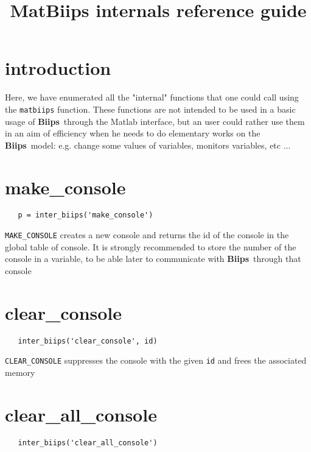 \documentclass[11pt,twoside]{article}
\newcommand{\biips}{{\bf Biips}{}}
\begin{document}
\title{MatBiips internals reference guide}
\date{}

\maketitle

\tableofcontents

\section{introduction}

  Here, we have enumerated all the "internal" functions that one could call using the \texttt{matbiips} function. These functions are not intended
  to be used in a basic usage of \biips\ through the Matlab interface, but an user could rather use them in an aim of efficiency when he needs to
  do elementary works on the \biips\ model: e.g. change some values of variables, monitors variables, etc ...

\section{make\_console}
 \begin{lstlisting}
   p = inter_biips('make_console')
 \end{lstlisting}

   \texttt{MAKE\_CONSOLE}  creates a new console and returns the id of the console in the global table of console. It
   is strongly recommended to store the number of the console in a variable, to be able later to communicate with \biips\  through that
   console

\section{clear\_console}

 \begin{lstlisting}
   inter_biips('clear_console', id)
 \end{lstlisting}

  \texttt{CLEAR\_CONSOLE} suppresses the console with the given \texttt{id} and frees the associated memory

\section{clear\_all\_console}

 \begin{lstlisting}
   inter_biips('clear_all_console')
 \end{lstlisting}
\end{document}
